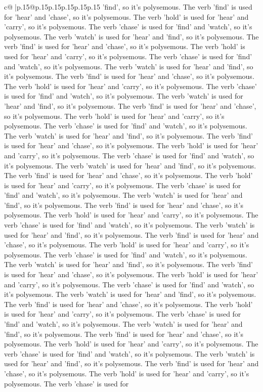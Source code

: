 \documentclass{article}
\begin{document}
{\begin{supertabular}{c@{$\;$}|p{.15\linewidth}@{}p{.15\linewidth}p{.15\linewidth}p{.15\linewidth}p{.15\linewidth}p{.15\linewidth}}
{{{'find', so it's polysemous. The verb 'find' is used for 'hear' and 'chase', so it's polysemous. The verb 'hold' is used for 'hear' and 'carry', so it's polysemous. The verb 'chase' is used for 'find' and 'watch', so it's polysemous. The verb 'watch' is used for 'hear' and 'find', so it's polysemous. The verb 'find' is used for 'hear' and 'chase', so it's polysemous. The verb 'hold' is used for 'hear' and 'carry', so it's polysemous. The verb 'chase' is used for 'find' and 'watch', so it's polysemous. The verb 'watch' is used for 'hear' and 'find', so it's polysemous. The verb 'find' is used for 'hear' and 'chase', so it's polysemous. The verb 'hold' is used for 'hear' and 'carry', so it's polysemous. The verb 'chase' is used for 'find' and 'watch', so it's polysemous. The verb 'watch' is used for 'hear' and 'find', so it's polysemous. The verb 'find' is used for 'hear' and 'chase', so it's polysemous. The verb 'hold' is used for 'hear' and 'carry', so it's polysemous. The verb 'chase' is used for 'find' and 'watch', so it's polysemous. The verb 'watch' is used for 'hear' and 'find', so it's polysemous. The verb 'find' is used for 'hear' and 'chase', so it's polysemous. The verb 'hold' is used for 'hear' and 'carry', so it's polysemous. The verb 'chase' is used for 'find' and 'watch', so it's polysemous. The verb 'watch' is used for 'hear' and 'find', so it's polysemous. The verb 'find' is used for 'hear' and 'chase', so it's polysemous. The verb 'hold' is used for 'hear' and 'carry', so it's polysemous. The verb 'chase' is used for 'find' and 'watch', so it's polysemous. The verb 'watch' is used for 'hear' and 'find', so it's polysemous. The verb 'find' is used for 'hear' and 'chase', so it's polysemous. The verb 'hold' is used for 'hear' and 'carry', so it's polysemous. The verb 'chase' is used for 'find' and 'watch', so it's polysemous. The verb 'watch' is used for 'hear' and 'find', so it's polysemous. The verb 'find' is used for 'hear' and 'chase', so it's polysemous. The verb 'hold' is used for 'hear' and 'carry', so it's polysemous. The verb 'chase' is used for 'find' and 'watch', so it's polysemous. The verb 'watch' is used for 'hear' and 'find', so it's polysemous. The verb 'find' is used for 'hear' and 'chase', so it's polysemous. The verb 'hold' is used for 'hear' and 'carry', so it's polysemous. The verb 'chase' is used for 'find' and 'watch', so it's polysemous. The verb 'watch' is used for 'hear' and 'find', so it's polysemous. The verb 'find' is used for 'hear' and 'chase', so it's polysemous. The verb 'hold' is used for 'hear' and 'carry', so it's polysemous. The verb 'chase' is used for 'find' and 'watch', so it's polysemous. The verb 'watch' is used for 'hear' and 'find', so it's polysemous. The verb 'find' is used for 'hear' and 'chase', so it's polysemous. The verb 'hold' is used for 'hear' and 'carry', so it's polysemous. The verb 'chase' is used for 'find' and 'watch', so it's polysemous. The verb 'watch' is used for 'hear' and 'find', so it's polysemous. The verb 'find' is used for 'hear' and 'chase', so it's polysemous. The verb 'hold' is used for 'hear' and 'carry', so it's polysemous. The verb 'chase' is used for }}}
\end{supertabular}}
\end{document}
